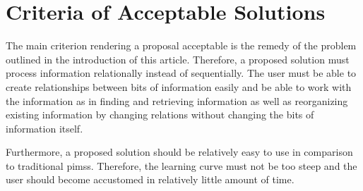 \section{Criteria of Acceptable Solutions}

The main criterion rendering a proposal acceptable is the remedy of the problem
outlined in the introduction of this article. Therefore, a proposed solution
must process information relationally instead of sequentially. The user must be
able to create relationships between bits of information easily and be able to
work with the information as in finding and retrieving information as well as
reorganizing existing information by changing relations without changing the
bits of information itself.

\iffalse
Relations -< verknüpfung (wort) unverständlich
\fi

Furthermore, a proposed solution should be relatively easy to use in comparison
to traditional \glspl{pims}. Therefore, the learning curve must not be too
steep and the user should become accustomed in relatively little amount of time.

\iffalse
Beispiel für diesen Use-Case
\fi
